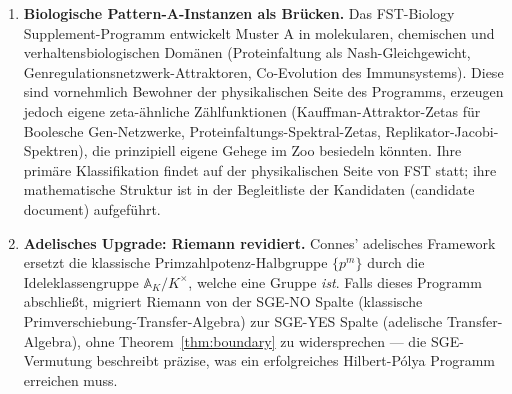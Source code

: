 \documentclass[11pt]{article}
\theoremstyle{definition}
\theoremstyle{remark}
\begin{document}
\begin{enumerate}
\begin{itemize}
  Die erste Flow-Zeta-Funktion mit realistischer Hoffnung auf experimentellen Zugang
  via Beobachtungen des Ringdown von Gravitationswellen (LIGO/Virgo/Einstein-Teleskop).
  \item \textbf{Yang-Lee-Nullstellen}:\\[-0.6ex]
  ferromagnetische Partitionsfunktionen;
  konjektural fluss-nichtkompakt, \textbf{SGE-YES}. Temperatur als
  kontinuierlicher Parameter; das Lee-Yang Kreistheorem spielt die Rolle
  eines RH-Analogons. Statistisch-mechanischer Cousin von CRM.
  \item \textbf{Bost-Connes System} (1995): eine quantenstatistische
  Realisierung von $\zeta(s)$ als Partitionsfunktion mit spontaner
  Symmetriebrechung bei $\beta = 1$. Sitzt auf der Brücke zwischen den
  arithmetischen und Fluss-Klassen und verbindet den Zoo direkt mit
  Connes' adelischem Framework \cite{BostConnes1995,Connes1999, Connes2026}.
  \end{itemize}
  Jede dieser Familien verdient beizeiten ein eigenes FST-Mathematics Supplement.
  Eine zweite Ebene von zwölf weiteren Konstruktionen
  (Epstein, Witten-Zeta, Multiple-Zeta-Werte, Hurwitz, Lerch,
  Arakelov, motivische $L$-Funktionen, chirale Zeta, RG-Zetas, Gromov-Witten,
  Reidemeister-Torsion, QFT spektrale Zetas) und eine separate Spalte
  biologischer Muster-A-abgeleiteter Zetas (Kauffman-Attraktor,
  Proteinfaltungs-Spektren, Replikator-Jacobi-Spektren) sind in
  dem Begleit-Baumdokument katalogisiert \cite{CandidatesMasterList}.

\item \textbf{Biologische Pattern-A-Instanzen als Brücken.} Das
  FST-Biology Supplement-Programm \cite{FSTBiology} entwickelt
  Muster A in molekularen, chemischen und verhaltensbiologischen Domänen
  (Proteinfaltung als Nash-Gleichgewicht, Genregulationsnetzwerk-Attraktoren,
  Co-Evolution des Immunsystems). Diese sind vornehmlich
  Bewohner der physikalischen Seite des Programms, erzeugen jedoch
  eigene zeta-ähnliche Zählfunktionen (Kauffman-Attraktor-Zetas für Boolesche Gen-Netzwerke, Proteinfaltungs-Spektral-Zetas,
  Replikator-Jacobi-Spektren), die prinzipiell eigene
  Gehege im Zoo besiedeln könnten. Ihre primäre Klassifikation
  findet auf der physikalischen Seite von FST statt; ihre mathematische Struktur ist
  in der Begleitliste der Kandidaten (candidate document) aufgeführt.

\item \textbf{Adelisches Upgrade: Riemann revidiert.} Connes' adelisches
  Framework \cite{Connes1999, Connes2026} ersetzt die klassische
  Primzahlpotenz-Halbgruppe $\{p^m\}$ durch die Ideleklassengruppe
  $\mathbb{A}_K/K^\times$, welche eine Gruppe \emph{ist}. Falls dieses
  Programm abschließt, migriert Riemann von der SGE-NO Spalte
  (klassische Primverschiebung-Transfer-Algebra) zur SGE-YES Spalte
  (adelische Transfer-Algebra), ohne Theorem~\ref{thm:boundary} zu widersprechen ---
  die SGE-Vermutung beschreibt
  präzise, was ein erfolgreiches Hilbert-P\'olya Programm
  erreichen muss.


\end{enumerate}
\end{document}
